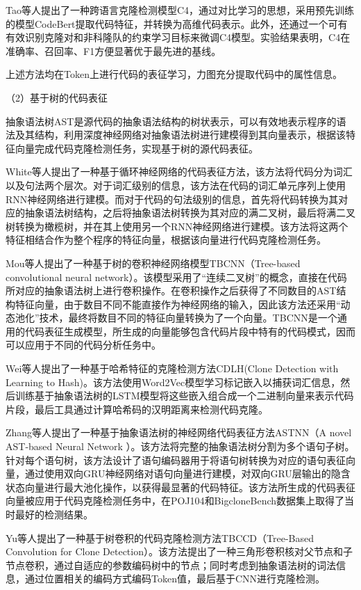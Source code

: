 Tao等人\cite{9796359}提出了一种跨语言克隆检测模型C4，通过对比学习的思想，采用预先训练的模型CodeBert提取代码特征，并转换为高维代码表示。此外，还通过一个可有有效识别克隆对和非科隆队的约束学习目标来微调C4模型。实验结果表明，C4在准确率、召回率、F1方便显著优于最先进的基线。

上述方法均在Token上进行代码的表征学习，力图充分提取代码中的属性信息。

（2）基于树的代码表征

抽象语法树AST是源代码的抽象语法结构的树状表示，可以有效地表示程序的语法及其结构，利用深度神经网络对抽象语法树进行建模得到其向量表示，根据该特征向量完成代码克隆检测任务，实现基于树的源代码表征。

White等人\cite{White2016DeepLC}提出了一种基于循环神经网络的代码表征方法，该方法将代码分为词汇以及句法两个层次。对于词汇级别的信息，该方法在代码的词汇单元序列上使用RNN神经网络进行建模。而对于代码的句法级别的信息，首先将代码转换为其对应的抽象语法树结构，之后将抽象语法树转换为其对应的满二叉树，最后将满二叉树转换为橄榄树，并在其上使用另一个RNN神经网络进行建模。该方法将这两个特征相结合作为整个程序的特征向量，根据该向量进行代码克隆检测任务。

Mou等人\cite{WOS:000485474201046}提出了一种基于树的卷积神经网络模型TBCNN（Tree-based convolutional neural network）。该模型采用了“连续二叉树”的概念，直接在代码所对应的抽象语法树上进行卷积操作。在卷积操作之后获得了不同数目的AST结构特征向量，由于数目不同不能直接作为神经网络的输入，因此该方法还采用“动态池化”技术，最终将数目不同的特征向量转换为了一个向量。TBCNN是一个通用的代码表征生成模型，所生成的向量能够包含代码片段中特有的代码模式，因而可以应用于不同的代码分析任务中。

Wei等人\cite{10.5555/3172077.3172312}提出了一种基于哈希特征的克隆检测方法CDLH(Clone Detection with Learning to Hash)。该方法使用Word2Vec模型学习标记嵌入以捕获词汇信息，然后训练基于抽象语法树的LSTM模型将这些嵌入组合成一个二进制向量来表示代码片段，最后工具通过计算哈希码的汉明距离来检测代码克隆。

Zhang等人\cite{8812062}提出了一种基于抽象语法树的神经网络代码表征方法ASTNN（A novel AST-based Neural Network ）。该方法将完整的抽象语法树分割为多个语句子树。针对每个语句树，该方法设计了语句编码器用于将语句树转换为对应的语句表征向量，通过使用双向GRU神经网络对语句向量进行建模，对双向GRU层输出的隐含状态向量进行最大池化操作，以获得最显著的代码特征。该方法所生成的代码表征向量被应用于代码克隆检测任务中，在POJ104\cite{WOS:000485474201046}和BigcloneBench\cite{7332459}数据集上取得了当时最好的检测结果。

Yu等人\cite{8813290}提出了一种基于树卷积的代码克隆检测方法TBCCD（Tree-Based Convolution for Clone Detection）。该方法提出了一种三角形卷积核对父节点和子节点卷积，通过自适应的参数编码树中的节点；同时考虑到抽象语法树的词法信息，通过位置相关的编码方式编码Token值，最后基于CNN进行克隆检测。

